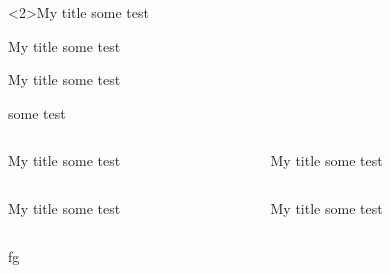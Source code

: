 \documentclass[
]{beamer}
\begin{document}
    
\begin{frame}[t]
  \begin{block}<2>{My title}
  some test
  \end{block}  

  \begin{alertblock}{My title}
  some test
  \end{alertblock}  
  
  \begin{exampleblock}{My title}
  some test
  \end{exampleblock}      
  
  \begin{theorem}[Quack]
  some test
  \end{theorem}        


\begin{columns}[onlytextwidth]
\begin{column}{.4\textwidth}
  \begin{block}{My title}
  some test
  \end{block}  
\end{column}
\begin{column}{.4\textwidth}
  \begin{exampleblock}{My title}
  some test
  \end{exampleblock}   
\end{column}
\end{columns}  
\end{frame} 

\begin{frame}
\begin{columns}[onlytextwidth]
\begin{column}{.4\textwidth}
  \begin{block}{My title}
  some test
  \end{block}  
\end{column}
\begin{column}{.4\textwidth}
  \begin{exampleblock}{My title}
  some test
  \end{exampleblock}   
\end{column}
\end{columns}

\begin{tcolorbox}
fg
\end{tcolorbox}

\end{frame}
\end{document}
